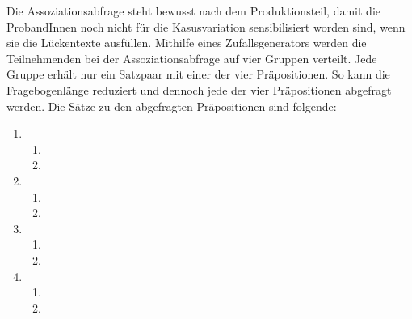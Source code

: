 Die Assoziationsabfrage steht bewusst nach dem Produktionsteil, damit die ProbandInnen noch nicht für die Kasusvariation sensibilisiert worden sind, wenn sie die Lückentexte ausfüllen.
Mithilfe eines Zufallsgenerators werden die Teilnehmenden bei der Assoziationsabfrage auf vier Gruppen verteilt. 
Jede Gruppe erhält nur ein Satzpaar mit einer der vier Präpositionen. 
So kann die Fragebogenlänge reduziert und dennoch jede der vier Präpositionen abgefragt werden. 
Die Sätze zu den abgefragten Präpositionen sind folgende: 
\begin{enumerate}
\item 
\begin{enumerate}
\item {}
\item {}
\end{enumerate}
\item 
\begin{enumerate}
\item {}
\item {}
\end{enumerate}
\item 
\begin{enumerate}
\item {}
\item {}
\end{enumerate}
\item 
\begin{enumerate}
\item {}
\item {}
\end{enumerate}
\end{enumerate}
